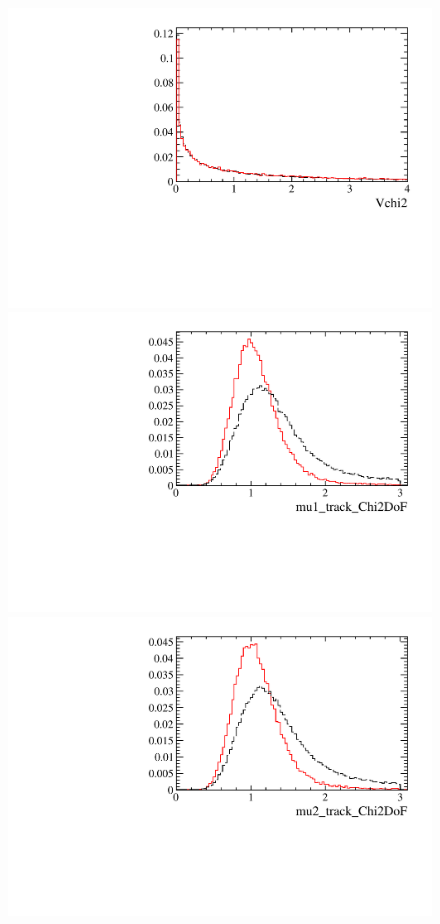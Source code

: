 \begin{figure} [htb!]
\begin{center}
\includegraphics[scale=0.20]{figs/Vchi2FULL2pipi.pdf}
\includegraphics[scale=0.20]{figs/mu1_track_Chi2DoFFULL2pipi.pdf}
\includegraphics[scale=0.20]{figs/mu2_track_Chi2DoFFULL2pipi.pdf}

\end{center}
\end{figure}
